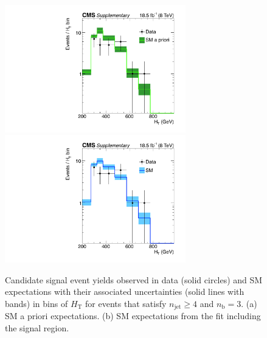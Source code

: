 \clearpage
\begin{figure}[h!]
  \begin{center}
    \includegraphics[width=0.7\textwidth]{eq3b_ge4j_prefit_log} 
    \includegraphics[width=0.7\textwidth]{eq3b_ge4j_postfit_log} \\
    \caption{Candidate signal event yields observed in data (solid
      circles) and SM expectations with their associated uncertainties
      (solid lines with bands) in bins of $H_\text{T}$ for events that
      satisfy $n_\text{jet} \geq 4$ and $n_\text{b} = 3$. (a) SM a
      priori expectations. (b) SM expectations from the fit including
      the signal region. }
  \end{center}
\end{figure}

